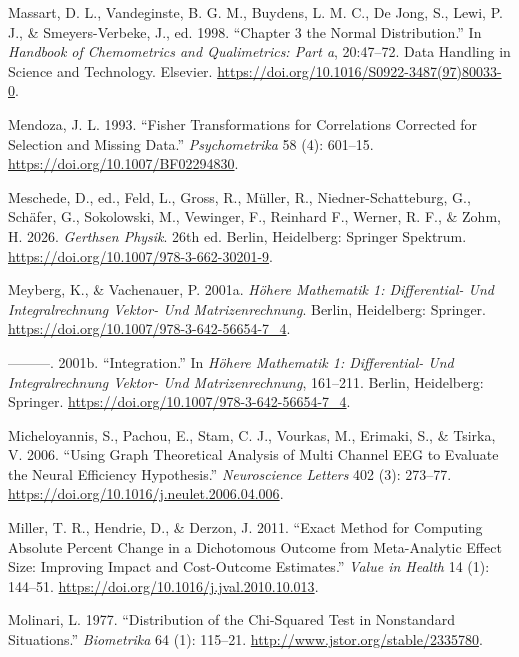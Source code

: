 \documentclass[
]{article}
\newlength{\cslhangindent}
\newlength{\cslentryspacingunit} %
\newenvironment{CSLReferences}[2] %
 {%
  \setlength{\parindent}{0pt}
  \ifodd #1
  \let\oldpar\par
  \def\par{\hangindent=\cslhangindent\oldpar}
  \fi
  \setlength{\parskip}{#2\cslentryspacingunit}
 }%
 {}
\begin{document}
\begin{CSLReferences}{1}{0}
\leavevmode{}%
Massart, D. L., Vandeginste, B. G. M., Buydens, L. M. C., De Jong, S.,
Lewi, P. J., \& Smeyers-Verbeke, J., ed. 1998. {``Chapter 3 the Normal
Distribution.''} In \emph{Handbook of Chemometrics and Qualimetrics:
Part a}, 20:47--72. Data Handling in Science and Technology. Elsevier.
\url{https://doi.org/10.1016/S0922-3487(97)80033-0}.

\leavevmode{}%
Mendoza, J. L. 1993. {``Fisher Transformations for Correlations
Corrected for Selection and Missing Data.''} \emph{Psychometrika} 58
(4): 601--15. \url{https://doi.org/10.1007/BF02294830}.

\leavevmode{}%
Meschede, D., ed., Feld, L., Gross, R., Müller, R., Niedner-Schatteburg,
G., Schäfer, G., Sokolowski, M., Vewinger, F., Reinhard F., Werner, R.
F., \& Zohm, H. 2026. \emph{Gerthsen Physik}. 26th ed. Berlin,
Heidelberg: Springer Spektrum.
\url{https://doi.org/10.1007/978-3-662-30201-9}.

\leavevmode{}%
Meyberg, K., \& Vachenauer, P. 2001a. \emph{H{ö}here Mathematik 1:
Differential- Und Integralrechnung Vektor- Und Matrizenrechnung}.
Berlin, Heidelberg: Springer.
\url{https://doi.org/10.1007/978-3-642-56654-7_4}.

\leavevmode{}%
---------. 2001b. {``Integration.''} In \emph{H{ö}here Mathematik 1:
Differential- Und Integralrechnung Vektor- Und Matrizenrechnung},
161--211. Berlin, Heidelberg: Springer.
\url{https://doi.org/10.1007/978-3-642-56654-7_4}.

\leavevmode{}%
Micheloyannis, S., Pachou, E., Stam, C. J., Vourkas, M., Erimaki, S., \&
Tsirka, V. 2006. {``Using Graph Theoretical Analysis of Multi Channel
EEG to Evaluate the Neural Efficiency Hypothesis.''} \emph{Neuroscience
Letters} 402 (3): 273--77.
\url{https://doi.org/10.1016/j.neulet.2006.04.006}.

\leavevmode{}%
Miller, T. R., Hendrie, D., \& Derzon, J. 2011. {``Exact Method for
Computing Absolute Percent Change in a Dichotomous Outcome from
Meta-Analytic Effect Size: Improving Impact and Cost-Outcome
Estimates.''} \emph{Value in Health} 14 (1): 144--51.
\url{https://doi.org/10.1016/j.jval.2010.10.013}.

\leavevmode{}%
Molinari, L. 1977. {``Distribution of the Chi-Squared Test in
Nonstandard Situations.''} \emph{Biometrika} 64 (1): 115--21.
\url{http://www.jstor.org/stable/2335780}.


\end{CSLReferences}
\end{document}
